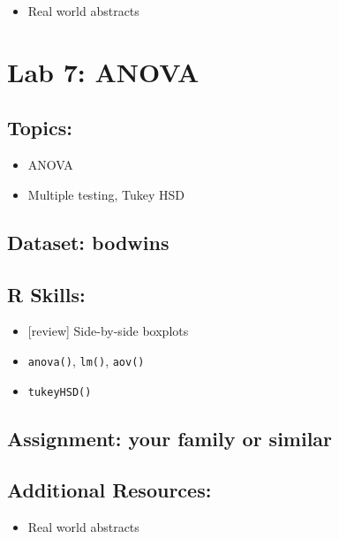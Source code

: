 \documentclass[]{article}
\providecommand{\tightlist}{%
  \setlength{\itemsep}{0pt}\setlength{\parskip}{0pt}}
\begin{document}
\begin{itemize}
\tightlist
\item
  Real world abstracts
\end{itemize}

\section{Lab 7: ANOVA}\label{lab-7-anova}

\subsection{Topics:}\label{topics-6}

\begin{itemize}
\tightlist
\item
  ANOVA
\item
  Multiple testing, Tukey HSD
\end{itemize}

\subsection{Dataset: bodwins}\label{dataset-bodwins}

\subsection{R Skills:}\label{r-skills-5}

\begin{itemize}
\tightlist
\item
  {[}review{]} Side-by-side boxplots
\item
  \texttt{anova()}, \texttt{lm()}, \texttt{aov()}
\item
  \texttt{tukeyHSD()}
\end{itemize}

\subsection{Assignment: your family or
similar}\label{assignment-your-family-or-similar}

\subsection{Additional Resources:}\label{additional-resources-5}

\begin{itemize}
\tightlist
\item
  Real world abstracts
\end{itemize}
\end{document}

